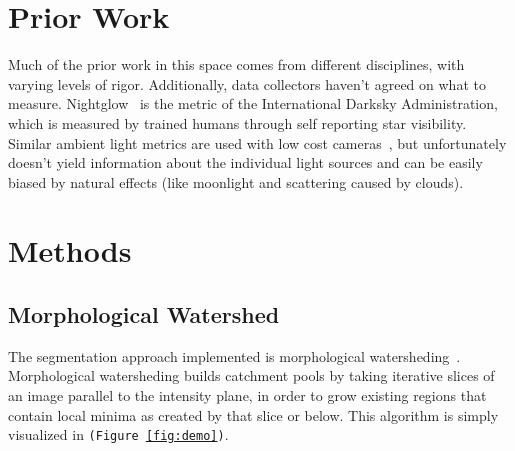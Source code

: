 \documentclass[11pt,twocolumn]{article} %
\def\ida{International Darksky Administration\xspace}
\begin{document}
\section{Prior Work}
Much of the prior work in this space comes from different disciplines, with varying levels of rigor. Additionally, data collectors haven't agreed on what to measure. Nightglow~\cite{ida} is the metric of the \ida, which is measured by trained humans through self reporting star visibility. Similar ambient light metrics are used with low cost cameras~\cite{camera}, but unfortunately doesn't yield information about the individual light sources and can be easily biased by natural effects (like moonlight and scattering caused by clouds).

\section{Methods}

\subsection{Morphological Watershed}
The segmentation approach implemented is morphological watersheding~\cite{dip}. Morphological watersheding builds catchment pools by taking iterative slices of an image parallel to the intensity plane, in order to grow existing regions that contain local minima as created by that slice or below. This algorithm is simply visualized in \texttt{(Figure~\ref{fig:demo})}.
\end{document}
